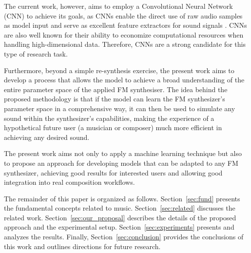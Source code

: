 \documentclass[10pt,conference]{IEEEtran}
\begin{document}
The current work, however, aims to employ a Convolutional Neural Network (CNN) to achieve its goals, as CNNs enable the direct use of raw audio samples as model input and serve as excellent feature extractors for sound signals \cite{kiranyaz2021survey}. CNNs are also well known for their ability to economize computational resources when handling high-dimensional data. Therefore, CNNs are a strong candidate for this type of research task.

Furthermore, beyond a simple re-synthesis exercise, the present work aims to develop a process that allows the model to achieve a broad understanding of the entire parameter space of the applied FM synthesiser. The idea behind the proposed methodology is that if the model can learn the FM synthesizer’s parameter space in a comprehensive way, it can then be used to simulate any sound within the synthesizer’s capabilities, making the experience of a hypothetical future user (a musician or composer) much more efficient in achieving any desired sound.

The present work aims not only to apply a machine learning technique but also to propose an approach for developing models that can be adapted to any FM synthesizer, achieving good results for interested users and allowing good integration into real composition workflows.

The remainder of this paper is organized as follows. Section~\ref{sec:fund} presents the fundamental concepts related to music. Section~\ref{sec:related} discusses the related work. Section~\ref{sec:our_proposal} describes the details of the proposed approach and the experimental setup. Section~\ref{sec:experiments} presents and analyzes the results. Finally, Section~\ref{sec:conclusion} provides the conclusions of this work and outlines directions for future research.



\end{document}
